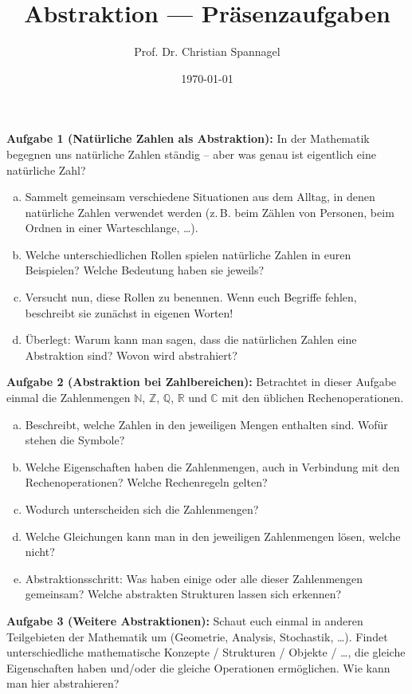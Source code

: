 \documentclass{../cssheet}
\title{Abstraktion --- Präsenzaufgaben}
\author{Prof. Dr. Christian Spannagel}
\date{\today}
\begin{document}
\printtitle


\textbf{Aufgabe 1 (Natürliche Zahlen als Abstraktion):}
In der Mathematik begegnen uns natürliche Zahlen ständig – aber was genau ist eigentlich eine natürliche Zahl?

\begin{enumerate}[a)]
\item Sammelt gemeinsam verschiedene Situationen aus dem Alltag, in denen natürliche Zahlen verwendet werden (z.\,B. beim Zählen von Personen, beim Ordnen in einer Warteschlange, \ldots).
\item Welche unterschiedlichen Rollen spielen natürliche Zahlen in euren Beispielen? Welche \glqq{}Bedeutung\grqq{} haben sie jeweils?
\item Versucht nun, diese Rollen zu benennen. Wenn euch Begriffe fehlen, beschreibt sie zunächst in eigenen Worten!
\item Überlegt: Warum kann man sagen, dass die natürlichen Zahlen eine Abstraktion sind? Wovon wird abstrahiert?
\end{enumerate}

\textbf{Aufgabe 2 (Abstraktion bei Zahlbereichen):}  Betrachtet in dieser Aufgabe einmal die Zahlenmengen  $\mathbb{N}$, $\mathbb{Z}$, $\mathbb{Q}$,  $\mathbb{R}$ und  $\mathbb{C}$ mit den üblichen Rechenoperationen.

\begin{enumerate}[a)]
\item Beschreibt, welche Zahlen in den jeweiligen Mengen enthalten sind. Wofür stehen die Symbole?
\item Welche Eigenschaften haben die Zahlenmengen, auch in Verbindung mit den Rechenoperationen? Welche Rechenregeln gelten?
\item Wodurch unterscheiden sich die Zahlenmengen?
\item Welche Gleichungen kann man in den jeweiligen Zahlenmengen lösen, welche nicht?
\item Abstraktionsschritt: Was haben einige oder alle dieser Zahlenmengen gemeinsam? Welche abstrakten Strukturen lassen sich erkennen?
\end{enumerate}


\textbf{Aufgabe 3 (Weitere Abstraktionen):}  Schaut euch einmal in anderen Teilgebieten der Mathematik um (Geometrie, Analysis, Stochastik, \ldots). Findet unterschiedliche mathematische Konzepte / Strukturen /  Objekte / \ldots, die gleiche Eigenschaften haben und/oder die gleiche Operationen ermöglichen. Wie kann man hier abstrahieren?

\vspace*{2cm}
\printlicense

\printsocials
\end{document}
